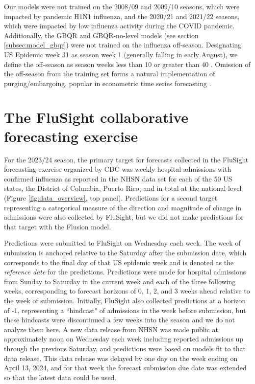 \documentclass{article}\usepackage[]{graphicx}\usepackage[]{xcolor}
\begin{document}
Our models were not trained on the 2008/09 and 2009/10 seasons, which were impacted by pandemic H1N1 influenza, and the 2020/21 and 2021/22 seasons, which were impacted by low influenza activity during the COVID pandemic. Additionally, the GBQR and GBQR-no-level models (see section \ref{subsec:model_gbqr}) were not trained on the influenza off-season. Designating US Epidemic week 31 as season week 1 (generally falling in early August), we define the off-season as season weeks less than 10 or greater than 40 \cite{nndss_2024}. Omission of the off-season from the training set forms a natural implementation of purging/embargoing, popular in econometric time series forecasting \cite{deprado2018financialML, lainder2022forecastingGBT}.

\section{The FluSight collaborative forecasting exercise}
\label{sec:flusight}

For the 2023/24 season, the primary target for forecasts collected in the FluSight forecasting exercise organized by CDC was weekly hospital admissions with confirmed influenza as reported in the NHSN data set for each of the 50 US states, the District of Columbia, Puerto Rico, and in total at the national level (Figure \ref{fig:data_overview}, top panel). Predictions for a second target representing a categorical measure of the direction and magnitude of change in admissions were also collected by FluSight, but we did not make predictions for that target with the Flusion model.

Predictions were submitted to FluSight on Wednesday each week. The week of submission is anchored relative to the Saturday after the submission date, which corresponds to the final day of that US epidemic week and is denoted as the \emph{reference date} for the predictions.
Predictions were made for hospital admissions from Sunday to Saturday in the current week and each of the three following weeks, corresponding to forecast horizons of 0, 1, 2, and 3 weeks ahead relative to the week of submission. Initially, FluSight also collected predictions at a horizon of -1, representing a ``hindcast" of admissions in the week before submission, but these hindcasts were discontinued a few weeks into the season and we do not analyze them here. A new data release from NHSN was made public at approximately noon on Wednesday each week including reported admissions up through the previous Saturday, and predictions were based on models fit to that data release. This data release was delayed by one day on the week ending on April 13, 2024, and for that week the forecast submission due date was extended so that the latest data could be used.
\end{document}
